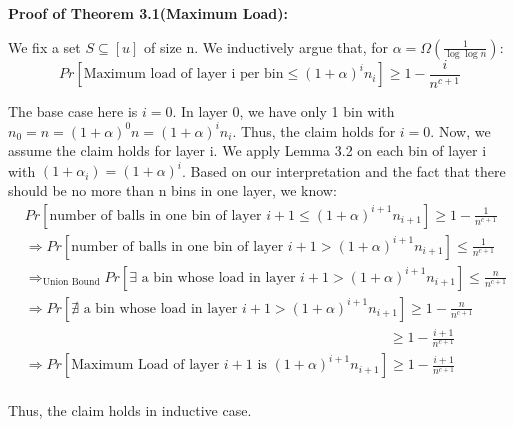 \documentclass[a4paper, english]{paper}
\begin{document}
	\noindent\textbf{Proof of Theorem 3.1(Maximum Load):} \par
	We fix a set $S\subseteq[u]$ of size n. We inductively argue that, for $\alpha = \Omega(\frac1{\log\log n})$:
	$$Pr\left[\text{Maximum load of layer i per bin}\le(1+\alpha)^in_i\right]\ge1-\frac i{n^{c+1}}$$\par
	The base case here is $i = 0$. In layer 0, we have only 1 bin with $n_0=n=(1+\alpha)^0n = (1+\alpha)^in_i$. Thus, the claim holds for $i=0$. Now, we assume the claim holds for layer i. We apply Lemma 3.2 on each bin of layer i with $(1+\alpha_i) = (1+\alpha)^i$. Based on our interpretation and the fact that there should be no more than n bins in one layer, we know:
\begin{align*}
&Pr\left[ \text{number of balls in one bin of layer }i+1\le (1+\alpha)^{i+1}n_{i+1}\right] \ge 1-\frac1{n^{c+1}}\\ 
&\Rightarrow Pr\left[ \text{number of balls in one bin of layer }i+1> (1+\alpha)^{i+1}n_{i+1}\right] \le \frac1{n^{c+1}}\\
&\Rightarrow_{\text{Union Bound}} Pr\left[ \exists \text{ a bin whose load in layer }i+1> (1+\alpha)^{i+1}n_{i+1}\right] \le \frac n{n^{c+1}}\\
&\Rightarrow Pr\left[ \nexists \text{ a bin whose load in layer }i+1> (1+\alpha)^{i+1}n_{i+1}\right] \ge 1-\frac n{n^{c+1}}\\
&\qquad\qquad\qquad\qquad\qquad\qquad\qquad\qquad\qquad\qquad\qquad\qquad\qquad\ge 1-\frac {i+1}{n^{c+1}}\\
&\Rightarrow Pr\left[ \text{Maximum Load of layer }i+1 \text{ is } (1+\alpha)^{i+1}n_{i+1}\right] \ge 1-\frac {i+1}{n^{c+1}}\\
\end{align*}\par
Thus, the claim holds in inductive case.\\
\end{document}
